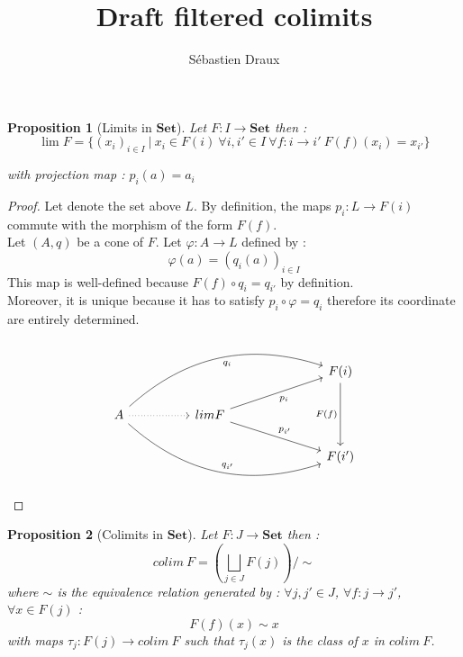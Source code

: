 \documentclass[12pt]{article}
\title{Draft filtered colimits}
\author{Sébastien Draux}
\newtheorem{prop}{Proposition}
\begin{document}
\maketitle

\begin{prop}[Limits in $\mathbf{Set}$]
Let $F : I \to \mathbf{Set}$ then :
$$ \lim F = \{ (x_i)_{i \in I} \  | \ x_i \in F(i)\  \forall i, i' \in I \ \forall f : i \to i' \ F(f)(x_i) = x_{i'}\}$$

with projection map : $p_i(a) = a_i$

\end{prop}

\begin{proof}
Let denote the set above $L$. By definition, the maps $p_i : L \to F(i)$ commute with the morphism of the form $F(f)$.\\
Let $(A, q)$ be a cone of $F$. Let $\varphi : A \to L$ defined by :
$$
\varphi(a) = (q_i(a))_{i \in I}
$$
This map is well-defined because $F(f) \circ q_i = q_{i'}$ by definition.\\
Moreover, it is unique because it has to satisfy $p_i \circ \varphi = q_i$ therefore its coordinate are entirely determined.

$$
\begin{tikzcd}
                                                                                            &  &                                                   &  &  & F(i) \arrow[dd, "F(f)"'] \\
A \arrow[rrrrrd, "q_{i'}", bend right] \arrow[rrrrru, "q_i"', bend left] \arrow[rr, dotted] &  & lim F \arrow[rrru, "p_i"'] \arrow[rrrd, "p_{i'}"] &  &  &                          \\
                                                                                            &  &                                                   &  &  & F(i')                   
\end{tikzcd}
$$

\end{proof}

\begin{prop}[Colimits in $\mathbf{Set}$]
Let $F : J \to \mathbf{Set}$ then :
$$
colim \ F = \left(\bigsqcup_{j \in J} F(j)\right) / \sim
$$
where $\sim$ is the equivalence relation generated by : $\forall j, j' \in J$, $\forall f : j \to j'$, $\forall x \in F(j)$ :
$$
F(f)(x) \sim x
$$
with maps $\tau_j : F(j) \to colim \ F$ such that $\tau_j(x)$ is the class of $x$ in $colim \ F$.
\end{prop}
\end{document}
